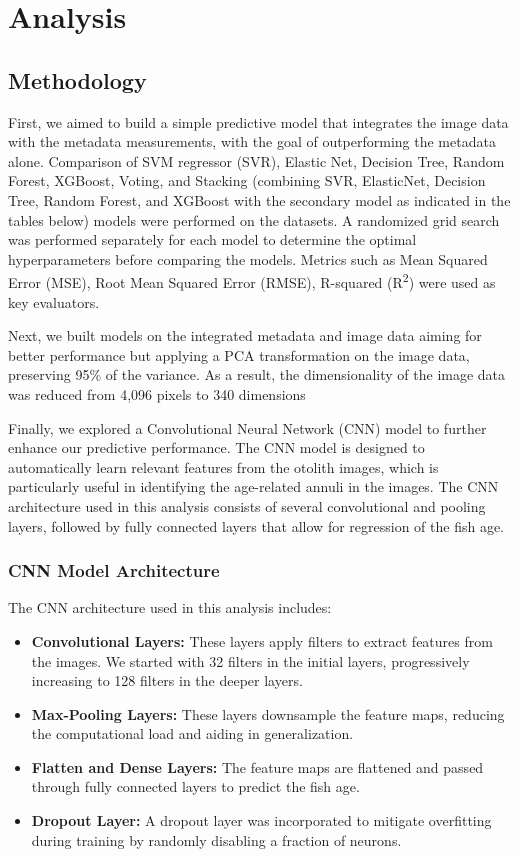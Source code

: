 \section{Analysis}

\subsection{Methodology}

First, we aimed to build a simple predictive model that integrates the image data with the metadata measurements, with the goal of outperforming the metadata alone.
Comparison of SVM regressor (SVR), Elastic Net, Decision Tree, Random Forest, XGBoost, Voting, and Stacking (combining SVR, ElasticNet, Decision Tree, Random Forest, and XGBoost with the secondary model as indicated in the tables below) models were performed on the datasets.
A randomized grid search was performed separately for each model to determine the optimal hyperparameters before comparing the models.
Metrics such as Mean Squared Error (MSE), Root Mean Squared Error (RMSE), R-squared (R\textsuperscript{2}) were used as key evaluators.

Next, we built models on the integrated metadata and image data aiming for better performance but applying a PCA transformation on the image data, preserving 95\% of the variance.
As a result, the dimensionality of the image data was reduced from 4,096 pixels to 340 dimensions

Finally, we explored a Convolutional Neural Network (CNN) model to further enhance our predictive performance.
The CNN model is designed to automatically learn relevant features from the otolith images, which is particularly useful in identifying the age-related annuli in the images.
The CNN architecture used in this analysis consists of several convolutional and pooling layers, followed by fully connected layers that allow for regression of the fish age.

\subsubsection{CNN Model Architecture}

The CNN architecture used in this analysis includes:

\begin{itemize}
    \item \textbf{Convolutional Layers:} These layers apply filters to extract features from the images. We started with 32 filters in the initial layers, progressively increasing to 128 filters in the deeper layers.
    \item \textbf{Max-Pooling Layers:} These layers downsample the feature maps, reducing the computational load and aiding in generalization.
    \item \textbf{Flatten and Dense Layers:} The feature maps are flattened and passed through fully connected layers to predict the fish age.
    \item \textbf{Dropout Layer:} A dropout layer was incorporated to mitigate overfitting during training by randomly disabling a fraction of neurons.
\end{itemize}

